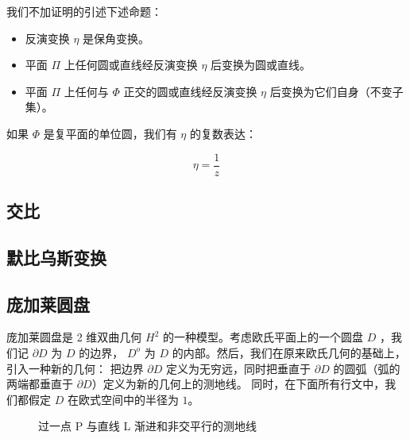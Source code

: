 \documentclass[a4paper,12pt]{article}
\begin{document}
我们不加证明的引述下述命题：

\begin{itemize}
\item 反演变换 $\eta$ 是保角变换。
\item 平面 $\Pi$ 上任何圆或直线经反演变换 $\eta$ 后变换为圆或直线。
\item 平面 $\Pi$ 上任何与 $\Phi$ 正交的圆或直线经反演变换 $\eta$ 后变换为它们自身（不变子集）。
\end{itemize}

如果 $\Phi$ 是复平面的单位圆，我们有 $\eta$ 的复数表达：

$$\eta = \frac{1}{z}$$

\newpage

\subsection{交比}
\newpage

\subsection{默比乌斯变换}
\newpage

\subsection{庞加莱圆盘}

庞加莱圆盘是 2 维双曲几何 $H^2$ 的一种模型。考虑欧氏平面上的一个圆盘 $D$ ，我们记 $\partial D$ 为 $D$ 的边界，
$D^o$ 为 $D$ 的内部。然后，我们在原来欧氏几何的基础上， 引入一种新的几何：
把边界 $\partial D$ 定义为无穷远，同时把垂直于 $\partial D$ 的圆弧（弧的两端都垂直于 $\partial D$）定义为新的几何上的测地线。
同时，在下面所有行文中，我们都假定 $D$ 在欧式空间中的半径为 $1$。

\begin{figure}[ht]
\centering
{}
\caption{过一点 P 与直线 L 渐进和非交平行的测地线}
\end{figure}
\end{document}
